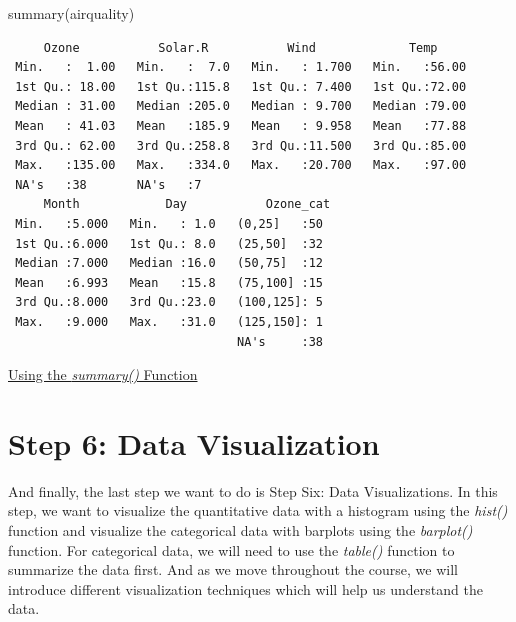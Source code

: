 \documentclass[
  letterpaper,
  DIV=11,
  numbers=noendperiod]{scrreprt}
\newenvironment{Shaded}{\begin{snugshade}}{\end{snugshade}}
\newcommand{\AttributeTok}[1]{\textcolor[rgb]{0.40,0.45,0.13}{#1}}
\newcommand{\ConstantTok}[1]{\textcolor[rgb]{0.56,0.35,0.01}{#1}}
\newcommand{\FunctionTok}[1]{\textcolor[rgb]{0.28,0.35,0.67}{#1}}
\newcommand{\NormalTok}[1]{\textcolor[rgb]{0.00,0.23,0.31}{#1}}
\newcommand{\SpecialCharTok}[1]{\textcolor[rgb]{0.37,0.37,0.37}{#1}}
\begin{document}
\begin{Shaded}
\begin{Highlighting}[]
\FunctionTok{summary}\NormalTok{(airquality)}
\end{Highlighting}
\end{Shaded}

\begin{verbatim}
     Ozone           Solar.R           Wind             Temp      
 Min.   :  1.00   Min.   :  7.0   Min.   : 1.700   Min.   :56.00  
 1st Qu.: 18.00   1st Qu.:115.8   1st Qu.: 7.400   1st Qu.:72.00  
 Median : 31.00   Median :205.0   Median : 9.700   Median :79.00  
 Mean   : 41.03   Mean   :185.9   Mean   : 9.958   Mean   :77.88  
 3rd Qu.: 62.00   3rd Qu.:258.8   3rd Qu.:11.500   3rd Qu.:85.00  
 Max.   :135.00   Max.   :334.0   Max.   :20.700   Max.   :97.00  
 NA's   :38       NA's   :7                                       
     Month            Day           Ozone_cat 
 Min.   :5.000   Min.   : 1.0   (0,25]   :50  
 1st Qu.:6.000   1st Qu.: 8.0   (25,50]  :32  
 Median :7.000   Median :16.0   (50,75]  :12  
 Mean   :6.993   Mean   :15.8   (75,100] :15  
 3rd Qu.:8.000   3rd Qu.:23.0   (100,125]: 5  
 Max.   :9.000   Max.   :31.0   (125,150]: 1  
                                NA's     :38  
\end{verbatim}

\begin{watch}{}{}
    \href{https://youtu.be/lDZzsabI2xw}{Using the \textit{summary()} Function}
\end{watch}

\section{Step 6: Data Visualization}\label{step-6-data-visualization}

And finally, the last step we want to do is Step Six: Data
Visualizations. In this step, we want to visualize the quantitative data
with a histogram using the \emph{hist()} function and visualize the
categorical data with barplots using the \emph{barplot()} function. For
categorical data, we will need to use the \emph{table()} function to
summarize the data first. And as we move throughout the course, we will
introduce different visualization techniques which will help us
understand the data.

\begin{Shaded}
\end{Shaded}
\end{document}

